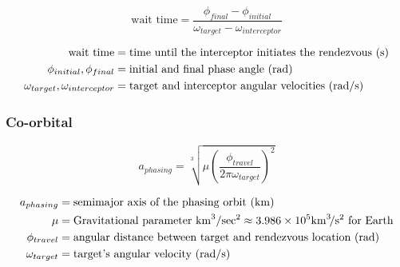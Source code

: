 \documentclass{article}
\newcommand{\myvarmukm}{\mu &= \text{Gravitational parameter \si{\kilo\meter\cubed\per\sec\squared}} \approx 3.986 \times 10^5 \si{\kilo\meter\cubed\per\second\squared} \text{ for Earth}}
\begin{document}
\begin{multicols}{3}
	\begin{equation*}
	\boxed{\text{wait time} = \dfrac{\phi_{final} - \phi_{initial}}{\omega_{target} - \omega_{interceptor}}}
	\end{equation*}
	
	\vfill\null
	\columnbreak
	\begin{align*}
	\text{wait time} &= \text{time until the interceptor initiates the rendezvous (\si{\second})}\\
	\phi_{initial}, \phi_{final} &= \text{initial and final phase angle (\si{\radian})}\\
	\omega_{target}, \omega_{interceptor} &= \text{target and interceptor angular velocities (\si{\radian\per\second})}\\
	\end{align*}
\end{multicols}

\subsubsection{Co-orbital}
\begin{multicols}{3}
	\begin{equation*}
	\boxed{a_{phasing} = \sqrt[3]{\mu\left(\dfrac{\phi_{travel}}{2\pi\omega_{target}}\right)^2}}
	\end{equation*}
	
	\vfill\null
	\columnbreak
	\begin{align*}
	a_{phasing} &= \text{semimajor axis of the phasing orbit (\si{\kilo\meter})}\\
	\myvarmukm\\
	\phi_{travel} &= \text{angular distance between target and rendezvous location (\si{\radian})}\\
	\omega_{target} &= \text{target's angular velocity (\si{\radian\per\second})}\\
	\end{align*}
\end{multicols}
\end{document}
